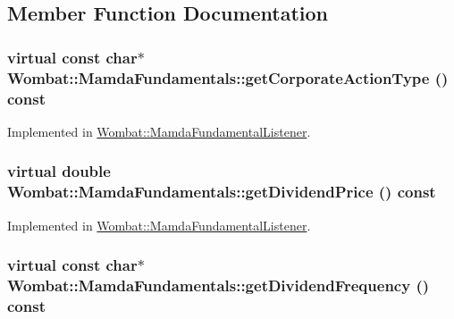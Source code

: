 \subsection{Member Function Documentation}
\hypertarget{classWombat_1_1MamdaFundamentals_c7ce1e97b6aa220000ceda1fb346d033}{
\subsubsection[getCorporateActionType]{\setlength{\rightskip}{0pt plus 5cm}virtual const char$\ast$ Wombat::Mamda\-Fundamentals::get\-Corporate\-Action\-Type () const}}
\label{classWombat_1_1MamdaFundamentals_c7ce1e97b6aa220000ceda1fb346d033}




Implemented in \hyperlink{classWombat_1_1MamdaFundamentalListener_5413a673ec90c6b17a47309351d12c5b}{Wombat::Mamda\-Fundamental\-Listener}.\hypertarget{classWombat_1_1MamdaFundamentals_7f47ca21e75508a2e09d25686dd98b1a}{
\subsubsection[getDividendPrice]{\setlength{\rightskip}{0pt plus 5cm}virtual double Wombat::Mamda\-Fundamentals::get\-Dividend\-Price () const}}
\label{classWombat_1_1MamdaFundamentals_7f47ca21e75508a2e09d25686dd98b1a}




Implemented in \hyperlink{classWombat_1_1MamdaFundamentalListener_b0117a9604ee4b562794e2148c9d514e}{Wombat::Mamda\-Fundamental\-Listener}.\hypertarget{classWombat_1_1MamdaFundamentals_f66bec2553735a9615e2c8c9a42946ce}{
\subsubsection[getDividendFrequency]{\setlength{\rightskip}{0pt plus 5cm}virtual const char$\ast$ Wombat::Mamda\-Fundamentals::get\-Dividend\-Frequency () const}}
\label{classWombat_1_1MamdaFundamentals_f66bec2553735a9615e2c8c9a42946ce}




